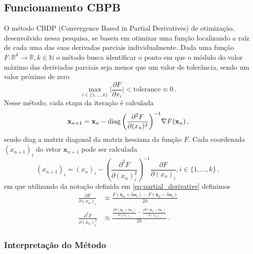 \subsection{Funcionamento CBPB}

O método CBDP (Convergence Based in Partial Derivatives) de otimização, desenvolvido nessa pesquisa, se baseia em otimizar uma função localizando a raíz de cada uma das suas derivadas parciais individualmente. Dada uma função $F: \mathds{R}^k \to \mathds{R}, k \in \mathds{N}$ o método busca identificar o ponto em que o módulo do valor máximo das deriviadas parciais seja menor que um valor de tolerância, sendo um valor próximo de zero
%
\begin{equation}
  \label{eq:convergence-criteria}
  \max_{i \in \{1,...,k\} } \Bigg| \frac{ \partial F}{\partial x_i} \Bigg| < \text{tolerance} \approx 0 \,.
\end{equation}
%
Nesse método, cada etapa da iteração é calculada
%
\begin{equation}
  \mathbf{x}_{n+1} = \mathbf{x}_n - \operatorname{diag}{\left(\frac{\partial^2 F}{\partial (x_{n})^2 }\right)}^{-1} \nabla F(\mathbf{x}_n) \,,
\end{equation}
%
sendo diag a matriz diagonal da matriz hessiana da função $F$. Cada coordenada $(x_{n+1})_i$ do vetor $\mathbf{x}_{n+1}$ pode ser calculada
%
\begin{equation}
  (x_{n+1})_i = (x_{n})_i - \left( \frac{\partial^2 F}{\partial (x_{n})_i^2 } \right)^{-1} \frac{\partial F}{\partial (x_{n})_i} , i \in \{1,...,k\} \,,
\end{equation}
%
em que utilizando da notação definida em \eqref{eq:partial_derivative} definimos
%
\begin{equation}
  \label{eq:partial-derivative-aprox}
  \begin{split}
    \frac{\partial F}{\partial (x_{n})_i}      & \approx \frac{F(\mathbf{x}_n + h \mathbf{e}_i) - F(\mathbf{x}_n - h \mathbf{e}_i)}{2h} \\
    \frac{\partial^2 F}{\partial (x_{n})_i^2 } & \approx \frac{\frac{\partial F(\mathbf{x}_n + h \mathbf{e}_i) }{\partial (x_{n})_i } - \frac{\partial F(\mathbf{x}_n - h \mathbf{e}_i)}{\partial (x_{n})_i }}{2h} \,.
  \end{split}
\end{equation}


\subsubsection{Interpretação do Método}

